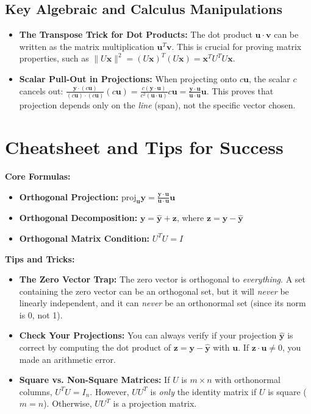 \documentclass[11pt, letterpaper]{article}
\theoremstyle{definition}
\theoremstyle{remark}
\begin{document}
\subsection{Key Algebraic and Calculus Manipulations}
\begin{itemize}
    \item \textbf{The Transpose Trick for Dot Products:} The dot product $\mathbf{u} \cdot \mathbf{v}$ can be written as the matrix multiplication $\mathbf{u}^T \mathbf{v}$. This is crucial for proving matrix properties, such as $\|U\mathbf{x}\|^2 = (U\mathbf{x})^T (U\mathbf{x}) = \mathbf{x}^T U^T U \mathbf{x}$.
    \item \textbf{Scalar Pull-Out in Projections:} When projecting onto $c\mathbf{u}$, the scalar $c$ cancels out: $\frac{\mathbf{y} \cdot (c\mathbf{u})}{(c\mathbf{u}) \cdot (c\mathbf{u})} (c\mathbf{u}) = \frac{c(\mathbf{y} \cdot \mathbf{u})}{c^2(\mathbf{u} \cdot \mathbf{u})} c\mathbf{u} = \frac{\mathbf{y} \cdot \mathbf{u}}{\mathbf{u} \cdot \mathbf{u}} \mathbf{u}$. This proves that projection depends only on the \textit{line} (span), not the specific vector chosen.
\end{itemize}

\section{Cheatsheet and Tips for Success}

\textbf{Core Formulas:}
\begin{itemize}
    \item \textbf{Orthogonal Projection:} $\text{proj}_{\mathbf{u}} \mathbf{y} = \frac{\mathbf{y} \cdot \mathbf{u}}{\mathbf{u} \cdot \mathbf{u}} \mathbf{u}$
    \item \textbf{Orthogonal Decomposition:} $\mathbf{y} = \hat{\mathbf{y}} + \mathbf{z}$, where $\mathbf{z} = \mathbf{y} - \hat{\mathbf{y}}$
    \item \textbf{Orthogonal Matrix Condition:} $U^T U = I$
\end{itemize}

\textbf{Tips and Tricks:}
\begin{itemize}
    \item \textbf{The Zero Vector Trap:} The zero vector is orthogonal to \textit{everything}. A set containing the zero vector can be an orthogonal set, but it will \textit{never} be linearly independent, and it can \textit{never} be an orthonormal set (since its norm is 0, not 1).
    \item \textbf{Check Your Projections:} You can always verify if your projection $\hat{\mathbf{y}}$ is correct by computing the dot product of $\mathbf{z} = \mathbf{y} - \hat{\mathbf{y}}$ with $\mathbf{u}$. If $\mathbf{z} \cdot \mathbf{u} \neq 0$, you made an arithmetic error.
    \item \textbf{Square vs. Non-Square Matrices:} If $U$ is $m \times n$ with orthonormal columns, $U^T U = I_n$. However, $U U^T$ is \textit{only} the identity matrix if $U$ is square ($m=n$). Otherwise, $U U^T$ is a projection matrix.
\end{itemize}
\end{document}
